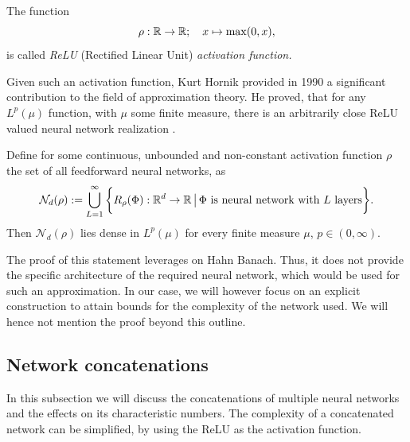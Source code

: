 \begin{definition}[ReLU] \label{def: relu activation function}
    The function
    \begin{equation*}
        \rho: \mathbb{R} \to \mathbb{R}; \quad x \mapsto \max(0, x),
    \end{equation*}
    is called \emph{ReLU} (Rectified Linear Unit) \emph{activation function.}
\end{definition}

Given such an activation function, Kurt Hornik provided in 1990 a significant contribution to the field of approximation
theory. He proved, that for any $L^p(\mu)$ function, with $\mu$ some finite measure, there is
an arbitrarily close ReLU valued neural network realization \cite{hornik1991nn}.

\begin{theorem} \label{theo: hornik theorem}
    Define for some continuous, unbounded and non-constant activation function $\rho$ the set of all feedforward neural networks, 
    as
    \begin{equation*}
        \mathcal{N}_d(\rho) := \bigcup_{L=1}^\infty \bigg\{ R_\rho(\Phi): \mathbb{R}^d \to \mathbb{R} \, \big\vert \, \Phi \mbox{ is neural network with } L\mbox{ layers} \bigg\}.
    \end{equation*}
    Then $\mathcal{N}_d(\rho)$ lies dense in $L^p(\mu)$ for every finite measure $\mu$, $p \in (0, \infty)$.
\end{theorem}

The proof of this statement leverages on Hahn Banach. Thus, it does not provide the specific architecture of
the required neural network, which would be used for such an approximation. In our case, we will however focus
on an explicit construction to attain bounds for the complexity of the network used. We will hence
not mention the proof beyond this outline. 

\subsection{Network concatenations}

In this subsection we will discuss the concatenations of multiple neural networks and the effects on its characteristic
numbers. The complexity of a concatenated network can be simplified, by using the ReLU as the activation function.

